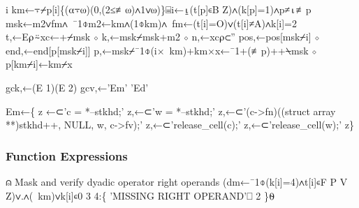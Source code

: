 \documentclass{article}%
\begin{document}
\nwenddocs{}\endmoddef\nwstartdeflinemarkup{}\nwenddeflinemarkup
i km←⍪⌿p[i]\{(⍺⍪⍵)(0,(2≤≢⍵)∧1∨⍵)\}⌸i←⍸(t[p]∊B Z)∧(k[p]=1)∧p≠⍳≢p
msk←m2∨fm∧~¯1⌽m2←km∧(1⌽km)∧~fm←(t[i]=O)∨(t[i]≠A)∧k[i]=2
t,←E⍴⍨xc←+⌿msk ⋄ k,←msk⌿msk+m2 ⋄ n,←xc⍴⊂''
pos,←pos[msk⌿i] ⋄ end,←end[p[msk⌿i]]
p,←msk⌿¯1⌽(i×~km)+km×x←¯1+(≢p)++⍀msk ⋄ p[km⌿i]←km⌿x
\nwendcode{}\nwdocspar

\nwenddocs{}\plusendmoddef\nwstartdeflinemarkup{}\nwenddeflinemarkup
gck,←(E 1)(E 2)
gcv,←'Em' 'Ed'
\nwendcode{}\nwdocspar

\nwenddocs{}\plusendmoddef\nwstartdeflinemarkup{}\nwenddeflinemarkup
Em←\{
        z ←⊂'c = *--stkhd;'
        z,←⊂'w = *--stkhd;'
        z,←⊂'(c->fn)((struct array **)stkhd++, NULL, w, c->fv);'
        z,←⊂'release_cell(c);'
        z,←⊂'release_cell(w);'
z\}
\nwendcode{}\nwdocspar

\subsubsection{Function Expressions}

\nwenddocs{}\endmoddef\nwstartdeflinemarkup{}\nwenddeflinemarkup
⍝ Mask and verify dyadic operator right operands
(dm←¯1⌽(k[i]=4)∧t[i]∊F P V Z)∨.∧(~km)∨k[i]∊0 3 4:\{
        'MISSING RIGHT OPERAND'⎕ 2
\}⍬
\end{document}
